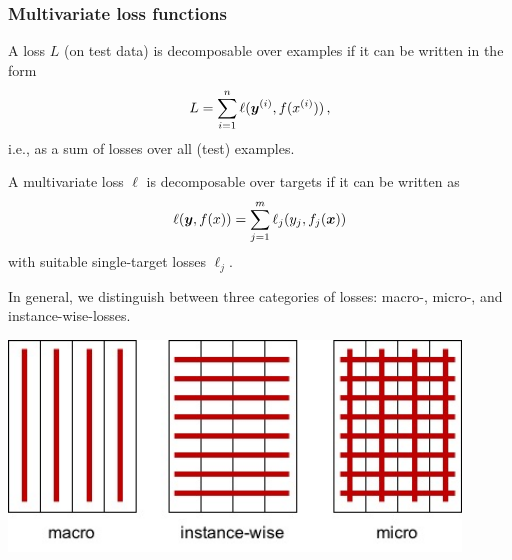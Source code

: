 \begin{frame}
	\frametitle{Multivariate loss functions}
	\small
	\begin{itemize}
%		
%
		\item A loss $L$ (on test data) is decomposable over examples if it can be written in the form
		$$
		L = \sum_{i=1}^n \ell(\bm{y}^{(i)}, f(x^{(i)})) 
		\, ,
		$$
		i.e., as a sum of losses over all (test) examples. 
		
		
		\item A multivariate loss $\ell$ is decomposable over targets if it can be written as
		$$
		\ell(\bm{y}, f(x)) = \sum_{j=1}^m \ell_j(y_j, f_j(\bm{x})) 
		$$
		with suitable single-target losses $\ell_j$. 
		
%		

		\begin{minipage}{0.45\textwidth}
%			
			\item  In general, we distinguish between three categories of losses: macro-, micro-, and instance-wise-losses. 
%			
		\end{minipage}
%	
		\begin{minipage}{0.45\textwidth}
			\begin{center}
				\includegraphics[width=0.9\textwidth]{figure/fmeasure}
			\end{center}
		\end{minipage}
%		
	\end{itemize}
%
\end{frame}






